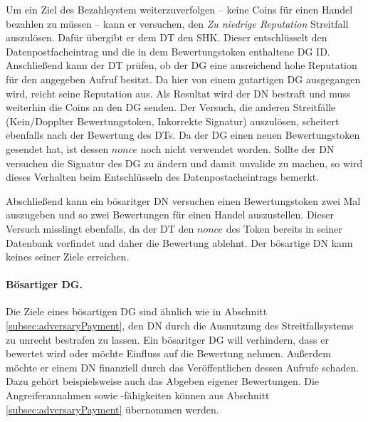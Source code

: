 \documentclass[
	fontsize=11pt,
	headings=small,
	parskip=half,           %
	bibliography=totoc,
	numbers=noenddot,       %
	open=any,               %
]{scrreprt}
\begin{document}
Um ein Ziel des Bezahlsystem weiterzuverfolgen -- keine Coins für einen Handel bezahlen zu müssen -- kann er versuchen, den \textit{Zu niedrige Reputation} Streitfall auszulösen. Dafür übergibt er dem DT den SHK. Dieser entschlüsselt den Datenpostfacheintrag und die in dem Bewertungstoken enthaltene DG ID. Anschließend kann der DT prüfen, ob der DG eine ausreichend hohe Reputation für den angegeben Aufruf besitzt. Da hier von einem gutartigen DG ausgegangen wird, reicht seine Reputation aus. Als Resultat wird der DN bestraft und muss weiterhin die Coins an den DG senden. Der Versuch, die anderen Streitfälle (Kein/Dopplter Bewertungstoken, Inkorrekte Signatur) auszulösen, scheitert ebenfalls nach der Bewertung des DTs. Da der DG einen neuen Bewertungstoken gesendet hat, ist dessen $nonce$ noch nicht verwendet worden. Sollte der DN versuchen die Signatur des DG zu ändern und damit unvalide zu machen, so wird dieses Verhalten beim Entschlüsseln des Datenpostacheintrags bemerkt.

Abschließend kann ein bösaritger DN versuchen einen Bewertungstoken zwei Mal auszugeben und so zwei Bewertungen für einen Handel auszustellen. Dieser Versuch misslingt ebenfalls, da der DT den $nonce$ des Token bereits in seiner Datenbank vorfindet und daher die Bewertung ablehnt. Der bösartige DN kann keines seiner Ziele erreichen.

\paragraph{Bösartiger DG.}
Die Ziele eines bösartigen DG sind ähnlich wie in Abschnitt \ref{subsec:adversaryPayment}, den DN durch die Ausnutzung des Streitfallsystems zu unrecht bestrafen zu lassen. Ein bösaritger DG will verhindern, dass er bewertet wird oder möchte Einfluss auf die Bewertung nehmen. Außerdem möchte er einem DN finanziell durch das Veröffentlichen dessen Aufrufe schaden. Dazu gehört beispielsweise auch das Abgeben eigener Bewertungen. Die Angreiferannahmen sowie -fähigkeiten können aus Abschnitt \ref{subsec:adversaryPayment} übernommen werden.
\end{document}

